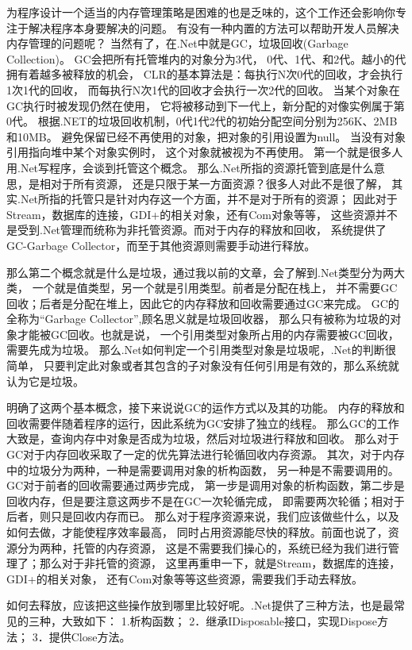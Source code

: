 \documentclass{book}
\begin{document}
为程序设计一个适当的内存管理策略是困难的也是乏味的，这个工作还会影响你专注于解决程序本身要解决的问题。
有没有一种内置的方法可以帮助开发人员解决内存管理的问题呢？
当然有了，在.Net中就是GC，垃圾回收(Garbage Collection)。
GC会把所有托管堆内的对象分为3代，
0代、1代、和2代。越小的代拥有着越多被释放的机会，
CLR的基本算法是：每执行N次0代的回收，才会执行1次1代的回收，
而每执行N次1代的回收才会执行一次2代的回收。
当某个对象在GC执行时被发现仍然在使用，
它将被移动到下一代上，新分配的对像实例属于第0代。
根据.NET的垃圾回收机制，0代1代2代的初始分配空间分别为256K、2MB和10MB。
避免保留已经不再使用的对象，把对象的引用设置为null。
当没有对象引用指向堆中某个对象实例时，
这个对象就被视为不再使用。
第一个就是很多人用.Net写程序，会谈到托管这个概念。
那么.Net所指的资源托管到底是什么意思，是相对于所有资源，
还是只限于某一方面资源？很多人对此不是很了解，
其实.Net所指的托管只是针对内存这一个方面，并不是对于所有的资源；
因此对于Stream，数据库的连接，GDI+的相关对象，还有Com对象等等，
这些资源并不是受到.Net管理而统称为非托管资源。而对于内存的释放和回收，
系统提供了GC-Garbage Collector，而至于其他资源则需要手动进行释放。

那么第二个概念就是什么是垃圾，通过我以前的文章，会了解到.Net类型分为两大类，
一个就是值类型，另一个就是引用类型。前者是分配在栈上，
并不需要GC回收；后者是分配在堆上，因此它的内存释放和回收需要通过GC来完成。
GC的全称为“Garbage Collector”,顾名思义就是垃圾回收器，
那么只有被称为垃圾的对象才能被GC回收。也就是说，
一个引用类型对象所占用的内存需要被GC回收，需要先成为垃圾。
那么.Net如何判定一个引用类型对象是垃圾呢，.Net的判断很简单，
只要判定此对象或者其包含的子对象没有任何引用是有效的，那么系统就认为它是垃圾。

明确了这两个基本概念，接下来说说GC的运作方式以及其的功能。
内存的释放和回收需要伴随着程序的运行，因此系统为GC安排了独立的线程。
那么GC的工作大致是，查询内存中对象是否成为垃圾，然后对垃圾进行释放和回收。
那么对于GC对于内存回收采取了一定的优先算法进行轮循回收内存资源。
其次，对于内存中的垃圾分为两种，一种是需要调用对象的析构函数，
另一种是不需要调用的。GC对于前者的回收需要通过两步完成，
第一步是调用对象的析构函数，第二步是回收内存，但是要注意这两步不是在GC一次轮循完成，
即需要两次轮循；相对于后者，则只是回收内存而已。
那么对于程序资源来说，我们应该做些什么，以及如何去做，才能使程序效率最高，
同时占用资源能尽快的释放。前面也说了，资源分为两种，托管的内存资源，
这是不需要我们操心的，系统已经为我们进行管理了；那么对于非托管的资源，
这里再重申一下，就是Stream，数据库的连接，GDI+的相关对象，
还有Com对象等等这些资源，需要我们手动去释放。

如何去释放，应该把这些操作放到哪里比较好呢。.Net提供了三种方法，也是最常见的三种，大致如下：
1.析构函数；
2．继承IDisposable接口，实现Dispose方法；
3．提供Close方法。
\end{document}
